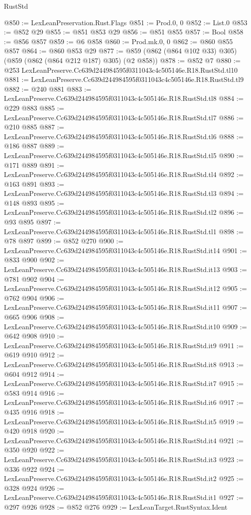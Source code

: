 \begin{lexlean}{RustStd}
\begin{coremodule}
@850 := LexLeanPreservation.Rust.Flags
@851 := Prod.{0, 0}
@852 := List.{0}
@853 := @852 @29
@855 := @851 @853 @29
@856 := @851 @855
@857 := Bool
@858 := @856 @857
@859 := @6 @858
@860 := Prod.mk.{0, 0}
@862 := @860 @855 @857
@864 := @860 @853 @29
@877 := @859 (@862 (@864 @102 @33) @305) (@859 (@862 (@864 @212 @187) @305) (@2 @858))
@878 := @852 @7
@880 := @253 LexLeanPreserve.Cc639d244984595f0311043c4c505146e.R18.RustStd.tl10
@881 := LexLeanPreserve.Cc639d244984595f0311043c4c505146e.R18.RustStd.tl9
@882 := @240 @881
@883 := LexLeanPreserve.Cc639d244984595f0311043c4c505146e.R18.RustStd.tl8
@884 := @229 @883
@885 := LexLeanPreserve.Cc639d244984595f0311043c4c505146e.R18.RustStd.tl7
@886 := @210 @885
@887 := LexLeanPreserve.Cc639d244984595f0311043c4c505146e.R18.RustStd.tl6
@888 := @186 @887
@889 := LexLeanPreserve.Cc639d244984595f0311043c4c505146e.R18.RustStd.tl5
@890 := @171 @889
@891 := LexLeanPreserve.Cc639d244984595f0311043c4c505146e.R18.RustStd.tl4
@892 := @163 @891
@893 := LexLeanPreserve.Cc639d244984595f0311043c4c505146e.R18.RustStd.tl3
@894 := @148 @893
@895 := LexLeanPreserve.Cc639d244984595f0311043c4c505146e.R18.RustStd.tl2
@896 := @93 @895
@897 := LexLeanPreserve.Cc639d244984595f0311043c4c505146e.R18.RustStd.tl1
@898 := @78 @897
@899 := @852 @270
@900 := LexLeanPreserve.Cc639d244984595f0311043c4c505146e.R18.RustStd.it14
@901 := @833 @900
@902 := LexLeanPreserve.Cc639d244984595f0311043c4c505146e.R18.RustStd.it13
@903 := @781 @902
@904 := LexLeanPreserve.Cc639d244984595f0311043c4c505146e.R18.RustStd.it12
@905 := @762 @904
@906 := LexLeanPreserve.Cc639d244984595f0311043c4c505146e.R18.RustStd.it11
@907 := @665 @906
@908 := LexLeanPreserve.Cc639d244984595f0311043c4c505146e.R18.RustStd.it10
@909 := @642 @908
@910 := LexLeanPreserve.Cc639d244984595f0311043c4c505146e.R18.RustStd.it9
@911 := @619 @910
@912 := LexLeanPreserve.Cc639d244984595f0311043c4c505146e.R18.RustStd.it8
@913 := @604 @912
@914 := LexLeanPreserve.Cc639d244984595f0311043c4c505146e.R18.RustStd.it7
@915 := @583 @914
@916 := LexLeanPreserve.Cc639d244984595f0311043c4c505146e.R18.RustStd.it6
@917 := @435 @916
@918 := LexLeanPreserve.Cc639d244984595f0311043c4c505146e.R18.RustStd.it5
@919 := @420 @918
@920 := LexLeanPreserve.Cc639d244984595f0311043c4c505146e.R18.RustStd.it4
@921 := @350 @920
@922 := LexLeanPreserve.Cc639d244984595f0311043c4c505146e.R18.RustStd.it3
@923 := @336 @922
@924 := LexLeanPreserve.Cc639d244984595f0311043c4c505146e.R18.RustStd.it2
@925 := @328 @924
@926 := LexLeanPreserve.Cc639d244984595f0311043c4c505146e.R18.RustStd.it1
@927 := @297 @926
@928 := @852 @276
@929 := LexLeanTarget.RustSyntax.Ident

\end{coremodule}
\end{lexlean}
